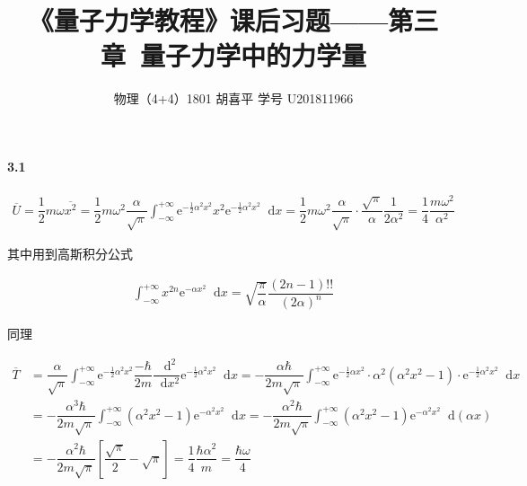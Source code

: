 \documentclass{article}
\author{物理（4+4）1801 \quad 胡喜平 \quad 学号 U201811966}
\affil{网站 https://hxp.plus/ \quad 邮件 hxp201406@gmail.com}
\title{《量子力学教程》课后习题——第三章\ 量子力学中的力学量}
\newcommand*{\md}{\mathop{}\!\mathrm{d}}
\newcommand*{\me}{\mathrm{e}}
\begin{document}
\maketitle\thispagestyle{fancy}

\paragraph{3.1}

\begin{equation*}
  \begin{aligned}
    \overline{U} = \dfrac{1}{2} m \omega \overline{x^2} = \dfrac{1}{2} m \omega^2 \dfrac{\alpha}{\sqrt{\pi}} \int_{-\infty}^{+\infty} \me^{- \frac{1}{2}  \alpha^2 x^2} x^2 \me^{- \frac{1}{2}  \alpha^2 x^2} \md x =  \dfrac{1}{2} m \omega^2 \dfrac{\alpha}{\sqrt{\pi}} \cdot \dfrac{\sqrt{\pi}}{\alpha} \dfrac{1}{2\alpha^2} = \dfrac{1}{4} \dfrac{m \omega^2}{\alpha^2}       
  \end{aligned}
\end{equation*}

其中用到高斯积分公式

\begin{equation*}
  \begin{aligned}
    \int_{-\infty}^{+\infty} x^{2n} \me^{-\alpha x^2} \md x = \sqrt{\dfrac{\pi}{\alpha} } \dfrac{\left( 2n-1 \right)!!}{\left( 2\alpha \right)^n} 
  \end{aligned}
\end{equation*}

同理

\begin{equation*}
  \begin{aligned}
    \overline{T} &= \dfrac{\alpha}{\sqrt{\pi}} \int_{-\infty}^{+\infty} \me^{-\frac{1}{2} \alpha^2 x^2 } \dfrac{- \hbar}{2m} \dfrac{\md^2}{\md x^2} \me^{- \frac{1}{2} \alpha^2 x^2 } \md x
    = - \dfrac{\alpha \hbar}{2m\sqrt{\pi}} \int_{-\infty}^{+\infty} \me^{- \frac{1}{2} \alpha x^2} \cdot \alpha^2 \left( \alpha^2 x^2 - 1 \right) \cdot \me^{- \frac{1}{2} \alpha^2 x^2} \md x \\
    &= - \dfrac{\alpha^3 \hbar}{2 m \sqrt{\pi}} \int_{-\infty}^{+\infty} \left( \alpha^2 x^2 -1 \right) \me^{- \alpha^2 x^2} \md x
    = - \dfrac{\alpha^2 \hbar}{2m \sqrt{\pi}} \int_{- \infty}^{+ \infty} \left( \alpha^2 x^2 - 1 \right) \me^{- \alpha^2 x^2} \md \left( \alpha x \right) \\
    &= - \dfrac{\alpha^2 \hbar}{2m \sqrt{\pi}} \left[ \dfrac{\sqrt{\pi}}{2} - \sqrt{\pi} \right] 
    = \dfrac{1}{4} \dfrac{\hbar \alpha^2}{m}
    = \dfrac{\hbar \omega}{4} 
  \end{aligned}
\end{equation*}
\end{document}
